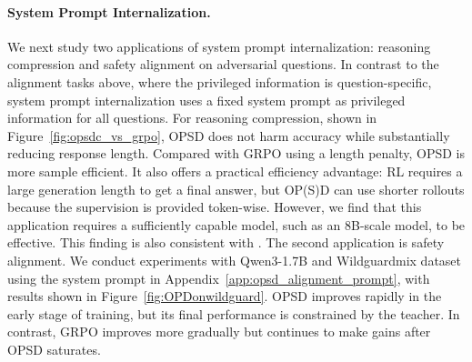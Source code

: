 \paragraph{System Prompt Internalization.} We next study two applications of system prompt internalization: reasoning compression and safety alignment on adversarial questions. In contrast to the alignment tasks above, where the privileged information is question-specific, system prompt internalization uses a fixed system prompt as privileged information for all questions. For reasoning compression, shown in Figure~\ref{fig:opsdc_vs_grpo}, OPSD does not harm accuracy while substantially reducing response length. Compared with GRPO using a length penalty, OPSD is more sample efficient. It also offers a practical efficiency advantage: RL requires a large generation length to get a final answer, but OP(S)D can use shorter rollouts because the supervision is provided token-wise. However, we find that this application requires a sufficiently capable model, such as an 8B-scale model, to be effective. This finding is also consistent with \cite{sang2026crispcompressedreasoningiterative}. The second application is safety alignment. We conduct experiments with Qwen3-1.7B and Wildguardmix dataset \cite{han2024wildguardopenonestopmoderation} using the system prompt in Appendix~\ref{app:opsd_alignment_prompt}, with results shown in Figure~\ref{fig:OPDonwildguard}. OPSD improves rapidly in the early stage of training, but its final performance is constrained by the teacher. In contrast, GRPO improves more gradually but continues to make gains after OPSD saturates.


